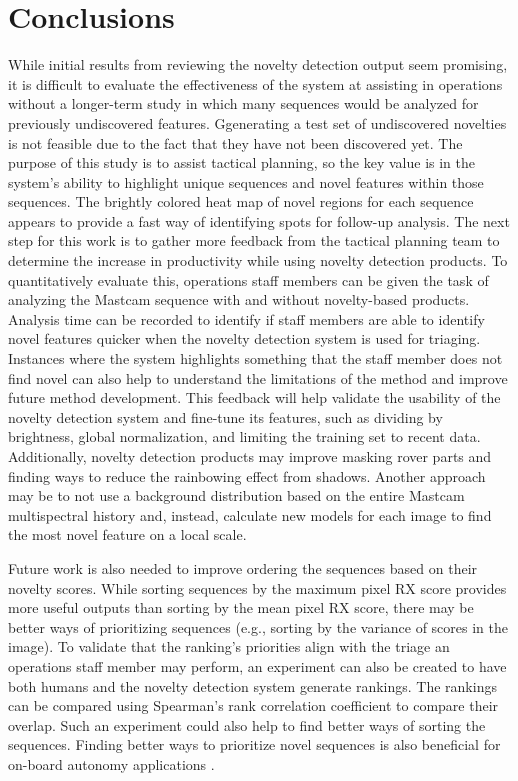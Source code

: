 \section{Conclusions}
While initial results from reviewing the novelty detection output seem promising, it is difficult to evaluate the effectiveness of the system at assisting in operations without a longer-term study in which many sequences would be analyzed for previously undiscovered features.
Ggenerating a test set of undiscovered novelties is not feasible due to the fact that they have not been discovered yet.
The purpose of this study is to assist tactical planning, so the key value is in the system's ability to highlight unique sequences and novel features within those sequences. 
The brightly colored heat map of novel regions for each sequence appears to provide a fast way of identifying spots for follow-up analysis. 
The next step for this work is to gather more feedback from the tactical planning team to determine the increase in productivity while using novelty detection products.
To quantitatively evaluate this, operations staff members can be given the task of analyzing the Mastcam sequence with and without novelty-based products.
Analysis time can be recorded to identify if staff members are able to identify novel features quicker when the novelty detection system is used for triaging.
Instances where the system highlights something that the staff member does not find novel can also help to understand the limitations of the method and improve future method development.
This feedback will help validate the usability of the novelty detection system and fine-tune its features, such as dividing by brightness, global normalization, and limiting the training set to recent data. 
Additionally, novelty detection products may improve masking rover parts and finding ways to reduce the rainbowing effect from shadows.
Another approach may be to not use a background distribution based on the entire Mastcam multispectral history and, instead, calculate new models for each image to find the most novel feature on a local scale.

Future work is also needed to improve ordering the sequences based on their novelty scores.
While sorting sequences by the maximum pixel RX score provides more useful outputs than sorting by the mean pixel RX score, there may be better ways of prioritizing sequences (e.g., sorting by the variance of scores in the image). %
To validate that the ranking's priorities align with the triage an operations staff member may perform, an experiment can also be created to have both humans and the novelty detection system generate rankings.
The rankings can be compared using Spearman's rank correlation coefficient to compare their overlap.
Such an experiment could also help to find better ways of sorting the sequences.
Finding better ways to prioritize novel sequences is also beneficial for on-board autonomy applications \parencite{wagstaffnovelty}.

